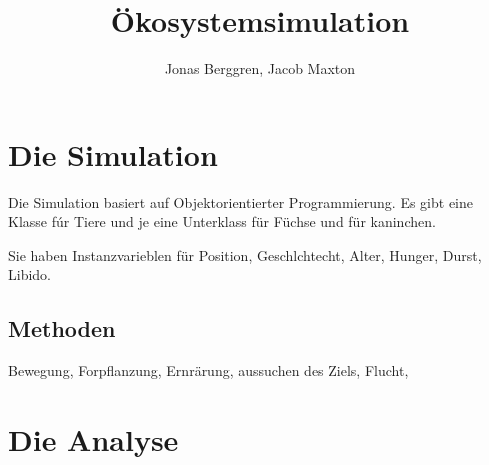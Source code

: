 \documentclass[12pt]{article}
\author{{\Large Jonas Berggren, Jacob Maxton}}
\title{{\myfont Ökosystemsimulation}}
\begin{document}
\maketitle
\tableofcontents
\newpage

\section{Die Simulation}
Die Simulation basiert auf Objektorientierter Programmierung.
Es gibt eine Klasse fúr Tiere und je eine Unterklass für Füchse und für kaninchen.

Sie haben Instanzvarieblen für Position, Geschlchtecht, Alter, Hunger, Durst, Libido.
\subsection{Methoden}
Bewegung, Forpflanzung, Ernrärung, aussuchen des Ziels, Flucht, 
\section{Die Analyse}
\end{document}
